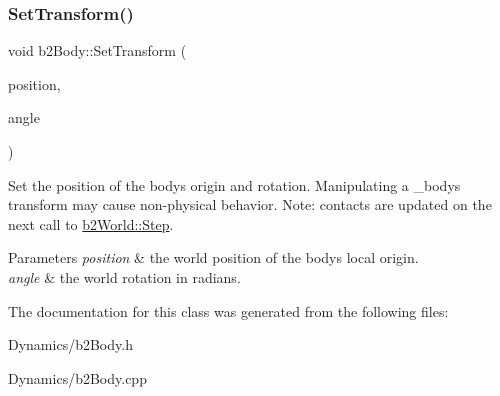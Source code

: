 \subsubsection{\texorpdfstring{Set\+Transform()}{SetTransform()}}
{\footnotesize\ttfamily void b2\+Body\+::\+Set\+Transform (\begin{DoxyParamCaption}\item[{const \mbox{\hyperlink{structb2Vec2}{b2\+Vec2}} \&}]{position,  }\item[{float32}]{angle }\end{DoxyParamCaption})}

Set the position of the body\textquotesingle{}s origin and rotation. Manipulating a _body\textquotesingle{}s transform may cause non-\/physical behavior. Note\+: contacts are updated on the next call to \mbox{\hyperlink{classb2World_a7a8eff61af98461f978fe43f3af7be90}{b2\+World\+::\+Step}}.
\begin{DoxyParams}{Parameters}
{\em position} & the world position of the body\textquotesingle{}s local origin. \\
\hline
{\em angle} & the world rotation in radians. \\
\hline
\end{DoxyParams}


The documentation for this class was generated from the following files\+:\begin{DoxyCompactItemize}
\item 
Dynamics/b2\+Body.\+h\item 
Dynamics/b2\+Body.\+cpp\end{DoxyCompactItemize}
